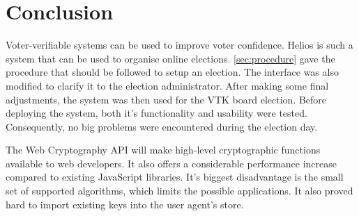 % 
%

\section{Conclusion}

Voter-verifiable systems can be used to improve voter confidence. Helios is such a system that can be used to organise online elections. \ref{sec:procedure} gave the procedure that should be followed to setup an election. The interface was also modified to clarify it to the election administrator. After making some final adjustments, the system was then used for the VTK board election. Before deploying the system, both it's functionality and usability were tested. Consequently, no big problems were encountered during the election day.

\par The Web Cryptography API will make high-level cryptographic functions available to web developers. It also offers a considerable performance increase compared to existing JavaScript libraries. It's biggest disadvantage is the small set of supported algorithms, which limits the possible applications. It also proved hard to import existing keys into the user agent's store.
